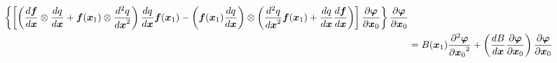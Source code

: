 \documentclass[a4paper]{article}
\newcommand{\deriv}[3][1]{%
    \ifthenelse{\equal{#1}{1}}{\frac{d #2}{d #3}}{\frac{d^#1 #2}{{d #3}^#1}}
}
\newcommand{\pderiv}[3][1]{%
    \ifthenelse{\equal{#1}{1}}{\frac{\partial #2}{\partial #3}}{\frac{\partial^#1 #2}{{\partial #3}^#1}}
}
\newcommand{\parens}[1]{\left(#1\right)}
\newcommand{\braces}[1]{\left\{#1\right\}}
\newcommand{\brackets}[1]{\left[#1\right]}
\newcommand{\traj}{\bm \varphi}
\begin{document}
\begin{align}
\begin{aligned}
        \braces{\brackets{\parens{
            \deriv{\bm f}{\bm x}
            \otimes \deriv{q}{\bm x}
            +
            \bm f(\bm x_1) \otimes \deriv[2]{q}{\bm x}
        }
        \deriv{q}{\bm x} \bm f(\bm x_1)
        -
        \parens{\bm f(\bm x_1) \deriv{q}{\bm x}}\otimes
        \parens{
            \deriv[2]{q}{\bm x} \bm f(\bm x_1)
            +
            \deriv{q}{\bm x} \deriv{\bm f}{\bm x}
        }}\pderiv{\traj}{\bm x_0}} \pderiv{\traj}{\bm x_0}
        \\
        &=
        B(\bm x_1) \pderiv[2]{\traj}{\bm x_0} +
        \parens{\deriv{B}{\bm x} \pderiv{\traj}{\bm x_0}} \pderiv{\traj}{\bm x_0}
    \end{aligned}
\end{align}
\end{document}
